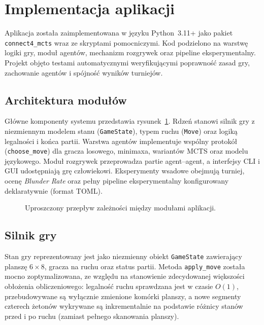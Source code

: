 \documentclass[11pt, a4paper]{article}
\begin{document}
\section{Implementacja aplikacji}
\label{sec:implementacja}

Aplikacja została zaimplementowana w języku Python~3.11+ jako pakiet \texttt{connect4\_mcts} wraz ze skryptami pomocniczymi. Kod podzielono na warstwę logiki gry, moduł agentów, mechanizm rozgrywek oraz pipeline eksperymentalny. Projekt objęto testami automatycznymi weryfikującymi poprawność zasad gry, zachowanie agentów i spójność wyników turniejów.

\subsection{Architektura modułów}

Główne komponenty systemu przedstawia rysunek~\ref{fig:architektura}. Rdzeń stanowi silnik gry z niezmiennym modelem stanu (\texttt{GameState}), typem ruchu (\texttt{Move}) oraz logiką legalności i końca partii. Warstwa agentów implementuje wspólny protokół (\texttt{choose\_move}) dla gracza losowego, minimaxa, wariantów MCTS oraz modelu językowego. Moduł rozgrywek przeprowadza partie agent--agent, a interfejsy CLI i GUI udostępniają grę człowiekowi. Eksperymenty wsadowe obejmują turniej, ocenę \textit{Blunder Rate} oraz pełny pipeline eksperymentalny konfigurowany deklaratywnie (format TOML).

\begin{figure}[H]
    \centering
    \caption{Uproszczony przepływ zależności między modułami aplikacji.}
    \label{fig:architektura}
\end{figure}

\subsection{Silnik gry}

Stan gry reprezentowany jest jako niezmienny obiekt \texttt{GameState} zawierający planszę $6 \times 8$, gracza na ruchu oraz status partii. Metoda \texttt{apply\_move} została mocno zoptymalizowana, ze względu na stanowienie zdecydowanej większości obłożenia obliczeniowego: legalność ruchu sprawdzana jest w czasie $O(1)$, przebudowywane są wyłącznie zmienione komórki planszy, a nowe segmenty czterech żetonów wykrywane są inkrementalnie na podstawie różnicy stanów przed i po ruchu (zamiast pełnego skanowania planszy).
\end{document}
